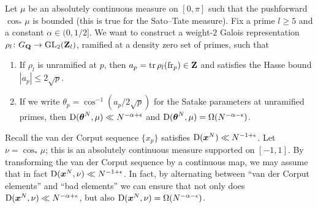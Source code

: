 Let $\mu$ be an absolutely continuous measure on $[0,\pi]$ such that the 
pushforward $\cos_\ast \mu$ is bounded (this is true for the Sato--Tate 
measure). Fix a prime $l\geqslant 5$ and a constant $\alpha\in (0,1/2]$. We 
want to construct a weight-$2$ Galois representation 
$\rho_l\colon G_{\mathbf{Q}} \to \operatorname{GL}_2(\mathbf{Z}_l)$, ramified at a density zero set of 
primes, such that 
\begin{enumerate}
\item
If $\rho_l$ is unramified at $p$, then $a_p = \operatorname{tr} \rho_l(\mathrm{fr}_p)\in \mathbf{Z}$ and 
satisfies the Hasse bound $|a_p| \leqslant 2\sqrt p$. 

\item
If we write $\theta_p = \cos^{-1}(a_p / 2\sqrt p)$ for the Satake parameters at 
unramified primes, then $\operatorname{D}({\boldsymbol\theta}^N, \mu) \ll N^{-\alpha+\epsilon}$ and 
$\operatorname{D}({\boldsymbol\theta}^N,\mu) = \Omega(N^{-\alpha-\epsilon})$. 
\end{enumerate}

Recall the van der Corput sequence $\{x_p\}$ satisfies 
$\operatorname{D}({\boldsymbol x}^N) \ll N^{-1+\epsilon}$. Let $\nu = \cos_\ast \mu$; this is an 
absolutely continuous measure supported on $[-1,1]$. By transforming the 
van der Corput sequence by a continuous map, we may assume that in fact 
$\operatorname{D}({\boldsymbol x}^N,\nu) \ll N^{-1+\epsilon}$. In fact, by alternating between 
``van der Corput elements'' and ``bad elements'' we can ensure that not 
only does $\operatorname{D}({\boldsymbol x}^N,\nu) \ll N^{-\alpha+\epsilon}$, but also 
$\operatorname{D}({\boldsymbol x}^N,\nu) = \Omega(N^{-\alpha-\epsilon})$. 
